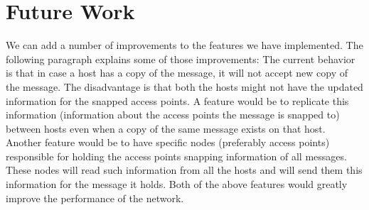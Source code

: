 \section{Future Work}
We can add a number of improvements to the features we have implemented. The following paragraph explains some of those improvements:\newline \newline
The current behavior is that in case a host has a copy of the message, it will not accept new copy of the message. The disadvantage is that both the hosts might not have the updated information for the snapped access points. A feature would be to replicate this information (information about the access points the message is snapped to) between hosts even when a copy of the same message exists on that host.\newline \newline
Another feature would be to have specific nodes (preferably access points) responsible for holding the access points snapping information of all messages. These nodes will read such information from all the hosts and will send them this information for the message it holds.\newline \newline
Both of the above features would greatly improve the performance of the network.
